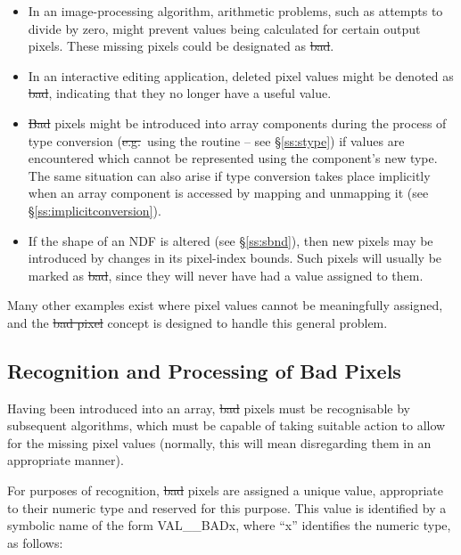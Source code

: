 \begin{itemize}

\item
In an image-processing algorithm, arithmetic problems, such as attempts to
divide by zero, might prevent values being calculated for certain output
pixels. 
These missing pixels could be designated as \st{bad}.

\item
In an interactive editing application, deleted pixel values might be denoted as
\st{bad}, indicating that they no longer have a useful value. 

\item
\st{Bad\/} pixels might be introduced into array components during the
process of type conversion (\st{e.g.}\ using the routine  -- see
\S\ref{ss:stype}) if values are encountered which cannot be represented
using the component's new type. 
The same situation can also arise if type conversion takes place implicitly
when an array component is accessed by mapping and unmapping it (see
\S\ref{ss:implicitconversion}). 

\item
If the shape of an NDF is altered (see \S\ref{ss:sbnd}), then new pixels may
be introduced by changes in its pixel-index bounds. 
Such pixels will usually be marked as \st{bad}, since they will never have
had a value assigned to them. 

\end{itemize}

Many other examples exist where pixel values cannot be meaningfully
assigned, and the \st{bad pixel\/} concept is designed to handle this general
problem. 

\subsection{Recognition and Processing of Bad Pixels}

Having been introduced into an array, \st{bad\/} pixels must be recognisable
by subsequent algorithms, which must be capable of taking suitable action to
allow for the missing pixel values (normally, this will mean disregarding
them in an appropriate manner). 

For purposes of recognition, \st{bad\/} pixels are assigned a unique value,
appropriate to their numeric type and reserved for this purpose. 
This value is identified by a symbolic name of the form VAL\_\_BADx, where
``x'' identifies the numeric type, as follows: 

